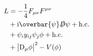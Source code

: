 

\begin{align*}
  L &= -\frac{1}{4} F_{\mu\nu} F^{\mu\nu} \\
    &+ \ii \overbar{\psi} \slashed{D} \psi + \mathrm{h.c.} \\
    &+ \psi_i y_{ij} \psi_j \phi + \mathrm{h.c.} \\
    &+ \bigl| \DD_\mu \phi \bigr|^2 - V(\phi)
\end{align*}

